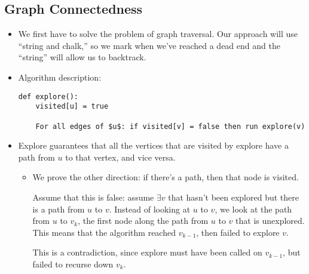 	\subsection{Graph Connectedness}
	\begin{itemize}
		\item We first have to solve the problem of graph traversal. Our approach will use ``string and chalk,''
			so we mark when we've reached a dead end and the ``string'' will allow us to backtrack. 
		\item Algorithm description:

\begin{lstlisting}[style=tt]
def explore():
	visited[u] = true

	For all edges of $u$: if visited[v] = false then run explore(v)
\end{lstlisting}
		\item Explore guarantees that all the vertices that are visited by explore have a path from $u$ to 
			that vertex, and vice versa.
			\begin{itemize}
				\item We prove the other direction: if there's a path, then that node is visited.

					Assume that this is false: assume $\exists v$ that hasn't been explored but there is 
					a path from $u$ to $v$. Instead of looking at $u$ to $v$, we look at the path 
					from $u$ to $v_k$, the first node along the path from $u$ to $v$ that is unexplored. 
					This means that the algorithm reached $v_{k - 1}$, then failed to explore $v$.

					This is a contradiction, since explore must have been called on $v_{k-1}$, but failed to 
					recurse down $v_k$. 
			\end{itemize}
	\end{itemize}

